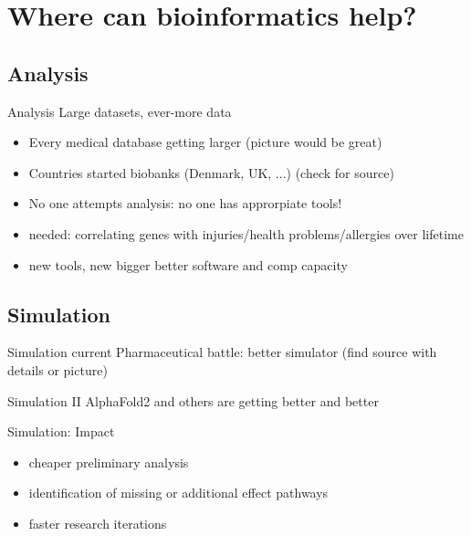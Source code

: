 \section{Where can bioinformatics help?}
\subsection{Analysis}

\begin{frame}[c]{Analysis}
    \large
    Large datasets, ever-more data

    \begin{itemize}[<+(1)->]
        \item Every medical database getting larger (picture would be great)
        \item Countries started biobanks (Denmark, UK, ...) (check for source)
        \item No one attempts analysis: no one has approrpiate tools!
        \item needed: correlating genes with injuries/health problems/allergies over lifetime 
        \item new tools, new bigger better software and comp capacity
    \end{itemize}
\end{frame}


\subsection{Simulation}

\begin{frame}[c]{Simulation}
    current Pharmaceutical battle: better simulator (find source with details or picture)
\end{frame}

\begin{frame}[c]{Simulation II}
    AlphaFold2 and others are getting better and better
\end{frame}

\begin{frame}[c]{Simulation: Impact}
    
    \begin{itemize}[<+(1)->]
        \item cheaper preliminary analysis
        \item identification of missing or additional effect pathways
        \item faster research iterations
    \end{itemize}
\end{frame}

